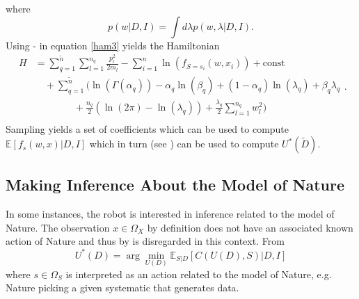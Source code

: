 where
\begin{equation}
	p(w|D,I) = \int d\lambda p(w,\lambda|D,I).
\end{equation}
Using - in equation \eqref{ham3} yields the Hamiltonian
\begin{equation}
	\begin{split}
		H&=\sum_{q=1}^{\tilde{n}}\sum_{l=1}^{n_q}\frac{p_{l}^2}{2m_{l}}-\sum_{i=1}^{n}\ln(f_{S = s_i}(w,x_i))+\text{const}\\
		&\quad+\sum_{q=1}^{\tilde{n}}\bigg(\ln(\Gamma(\alpha_q))-\alpha_q\ln(\beta_q)+(1-\alpha_q)\ln(\lambda_q)+\beta_q\lambda_q\\
		&\qquad \qquad+\frac{n_q}{2}(\ln(2\pi)-\ln(\lambda_q))+\frac{\lambda_q}{2}\sum_{l=1}^{n_q}w_l^2\bigg)\\
	\end{split}.
	\label{ham2}
\end{equation}
Sampling  yields a set of coefficients which can be used to compute $\mathbb{E}[f_s(w,x)|D,I]$ which in turn (see ) can be used to compute $U^*(\tilde{D})$.


\subsection{Making Inference About the Model of Nature}
In some instances, the robot is interested in inference related to the model of Nature. The observation $x\in \Omega_X$ by definition does not have an associated known action of Nature and thus by  is disregarded in this context. From 
\begin{equation}
	U^*(D) = \arg\min_{U(D)} \mathbb{E}_{S|D}[C(U(D), S)|D,I]
	\label{eq:best_decision}
\end{equation}
where $s \in \Omega_S$ is interpreted as an action related to the model of Nature, e.g. Nature picking a given systematic that generates data.


